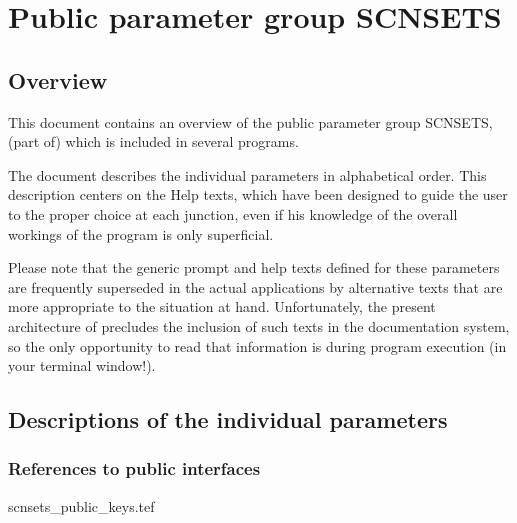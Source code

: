 
\chapter{ Public parameter group SCNSETS}
\tableofcontents


\section{ Overview}

	This document contains an overview of the public parameter group
SCNSETS, (part of) which is included in several \NEWSTAR programs.



	The
document describes the individual parameters in alphabetical order. This
description centers on the Help texts, which have been designed to guide the
user to the proper choice at each junction, even if his knowledge of the
overall workings of the program is only superficial.

	Please note that the generic prompt and help texts defined for these
parameters are frequently superseded in the actual applications by alternative
texts that are more appropriate to the situation at hand. Unfortunately, the
present architecture of \NEWSTAR precludes the inclusion of such texts in the
documentation system, so the only opportunity to read that information is
during program execution (in your terminal window!).


\section{ Descriptions of the individual parameters}
\label{.descriptions}

\subsection{ References to public interfaces}
\label{.public}

 {scnsets_public_keys.tef}

